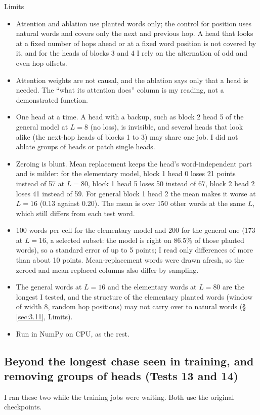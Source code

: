 \documentclass[paper=a4,fontsize=11pt,DIV=11,parskip=half,headings=small,numbers=noendperiod]{scrartcl}
\begin{document}
\begin{limbox}{Limits}
\begin{itemize}
\item Attention and ablation use planted words only; the control for position uses natural words and covers only
  the next and previous hop. A head that looks at a fixed number of hops ahead or at a fixed word position is
  not covered by it, and for the heads of blocks 3 and 4 I rely on the alternation of odd and even hop offsets.
\item Attention weights are not causal, and the ablation says only that a head is needed. The “what its
  attention does” column is my reading, not a demonstrated function.
\item One head at a time. A head with a backup, such as block 2 head 5 of the general model at $L=8$ (no loss),
  is invisible, and several heads that look alike (the next-hop heads of blocks 1 to 3) may share one job. I did
  not ablate groups of heads or patch single heads.
\item Zeroing is blunt. Mean replacement keeps the head’s word-independent part and is milder: for the
  elementary model, block 1 head 0 loses 21 points instead of 57 at $L=80$, block 1 head 5 loses 50 instead of
  67, block 2 head 2 loses 41 instead of 59. For general block 1 head 2 the mean makes it worse at $L=16$ (0.13
  against 0.20). The mean is over 150 other words at the same $L$, which still differs from each test word.
\item 100 words per cell for the elementary model and 200 for the general one (173 at $L=16$, a selected subset:
  the model is right on 86.5\% of those planted words), so a standard error of up to 5 points; I read only
  differences of more than about 10 points. Mean-replacement words were drawn afresh, so the zeroed and
  mean-replaced columns also differ by sampling.
\item The general words at $L=16$ and the elementary words at $L=80$ are the longest I tested, and the structure
  of the elementary planted words (window of width 8, random hop positions) may not carry over to natural words
  (\S\,\ref{sec:3.11}, Limits).
\item Run in NumPy on CPU, as the rest.
\end{itemize}
\end{limbox}

\subsection{Beyond the longest chase seen in training, and removing groups of heads (Tests 13 and
14)}\label{sec:3.13}
I ran these two while the training jobs were waiting. Both use the original checkpoints.
\end{document}

